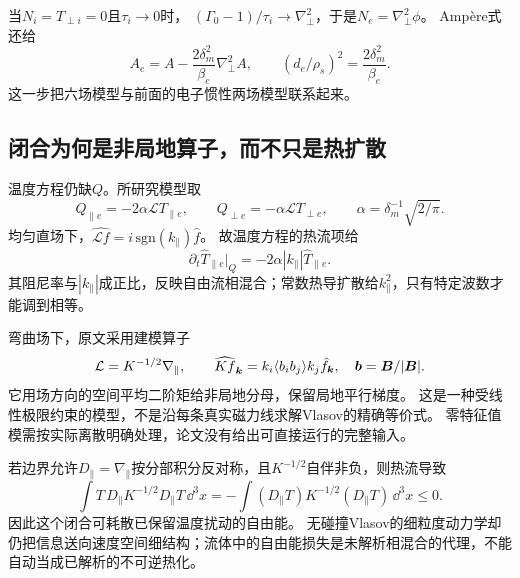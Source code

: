 \documentclass[UTF8,a4paper,11pt,openany,fontset=fandol]{ctexbook}
\begin{document}
当$N_i=T_{\perp i}=0$且$\tau_i\to0$时，
$(\Gamma_0-1)/\tau_i\to\nabla_\perp^2$，于是$N_e=\nabla_\perp^2\phi$。
Ampère式还给
\begin{equation}
 A_e=A-\frac{2\delta_m^2}{\beta_e}\nabla_\perp^2A,
 \qquad (d_e/\rho_s)^2=\frac{2\delta_m^2}{\beta_e}.
\end{equation}
这一步把六场模型与前面的电子惯性两场模型联系起来。

\subsection{闭合为何是非局地算子，而不只是热扩散}
温度方程仍缺$Q$。所研究模型取
\begin{equation}
 Q_{\parallel e}=-2\alpha\mathcal L T_{\parallel e},\qquad
 Q_{\perp e}=-\alpha\mathcal L T_{\perp e},\qquad
 \alpha=\delta_m^{-1}\sqrt{2/\pi}.
\end{equation}
均匀直场下，$\widehat{\mathcal L f}=i\,\mathrm{sgn}(k_\parallel)\hat f$。
故温度方程的热流项给
\begin{equation}
 \partial_t\widehat T_{\parallel e}\big|_Q
 =-2\alpha|k_\parallel|\widehat T_{\parallel e}.
\end{equation}
其阻尼率与$|k_\parallel|$成正比，反映自由流相混合；常数热导扩散给$k_\parallel^2$，只有特定波数才能调到相等。

弯曲场下，原文采用建模算子
\begin{equation}
 \mathcal L=K^{-1/2}\nabla_\parallel,\qquad
 \widehat{Kf}_{\bm{k}}=k_i\langle b_ib_j\rangle k_j\hat f_{\bm{k}},
 \quad\bm{b}=\bm{B}/|\bm{B}|.
 \label{eq:landau_nonlocal}
\end{equation}
它用场方向的空间平均二阶矩给非局地分母，保留局地平行梯度。
这是一种受线性极限约束的模型，不是沿每条真实磁力线求解Vlasov的精确等价式。
零特征值模需按实际离散明确处理，论文没有给出可直接运行的完整输入。

若边界允许$D_\parallel=\nabla_\parallel$按分部积分反对称，且$K^{-1/2}$自伴非负，则热流导致
\begin{equation}
 \int T\,D_\parallel K^{-1/2}D_\parallel T\,\dd^3x
 =-\int (D_\parallel T)K^{-1/2}(D_\parallel T)\,\dd^3x\le0.
\end{equation}
因此这个闭合可耗散已保留温度扰动的自由能。
无碰撞Vlasov的细粒度动力学却仍把信息送向速度空间细结构；流体中的自由能损失是未解析相混合的代理，不能自动当成已解析的不可逆热化。
\end{document}
